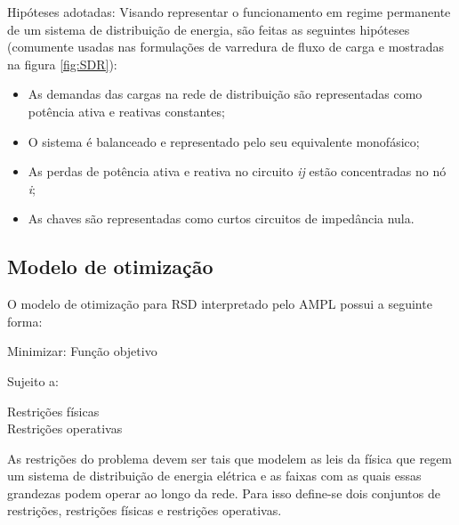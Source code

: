 Hipóteses adotadas:
Visando representar o funcionamento em regime permanente de um sistema de distribuição de energia, são feitas as seguintes hipóteses (comumente usadas nas formulações de varredura de fluxo de carga \cite{Shirmohammadi1988ANetworks} e mostradas na figura \ref{fig:SDR}):

\begin{itemize}
    \item As demandas das cargas na rede de distribuição são representadas como potência ativa e reativas constantes;

    \item O sistema é balanceado e representado pelo seu equivalente monofásico;
    
    \item As perdas de potência ativa e reativa no circuito \textit{ij} estão concentradas no nó \textit{i};
    
    \item As chaves são representadas como curtos circuitos de impedância nula.
\end{itemize}

\subsection{Modelo de otimização}

O modelo de otimização para RSD interpretado pelo AMPL possui a seguinte forma:

\begin{tcolorbox}[colback=white!10,title =\textbf{Modelo de um problema de otimização para RDS}]
    \begin{minipage}{\dimexpr\textwidth-\shadowsize-2\fboxrule-2\fboxsep-8pt}
    
    \begin{center}
        Minimizar: Função objetivo        
    \end{center}

    \hspace{2cm}Sujeito a:

    \begin{center}
        Restrições físicas\\
        Restrições operativas\\
    \end{center}
    \end{minipage}
\end{tcolorbox}


As restrições do problema devem ser tais que modelem as leis da física que regem um sistema de distribuição de energia elétrica e as faixas com as quais essas grandezas podem operar ao longo da rede.
Para isso define-se dois conjuntos de restrições, restrições físicas e restrições operativas.